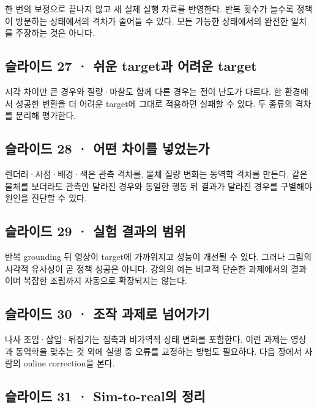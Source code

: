 \documentclass[11pt,a4paper]{article}
\begin{document}
한 번의 보정으로 끝나지 않고 새 실제 실행 자료를 반영한다. 반복 횟수가 늘수록 정책이 방문하는 상태에서의 격차가 줄어들 수 있다. 모든 가능한 상태에서의 완전한 일치를 주장하는 것은 아니다.\par

\subsection{슬라이드 27 · 쉬운 target과 어려운 target}

시각 차이만 큰 경우와 질량·마찰도 함께 다른 경우는 전이 난도가 다르다. 한 환경에서 성공한 변환을 더 어려운 target에 그대로 적용하면 실패할 수 있다. 두 종류의 격차를 분리해 평가한다.\par

\subsection{슬라이드 28 · 어떤 차이를 넣었는가}

렌더러·시점·배경·색은 관측 격차를, 물체 질량 변화는 동역학 격차를 만든다. 같은 물체를 보더라도 관측만 달라진 경우와 동일한 행동 뒤 결과가 달라진 경우를 구별해야 원인을 진단할 수 있다.\par

\subsection{슬라이드 29 · 실험 결과의 범위}

반복 grounding 뒤 영상이 target에 가까워지고 성능이 개선될 수 있다. 그러나 그림의 시각적 유사성이 곧 정책 성공은 아니다. 강의의 예는 비교적 단순한 과제에서의 결과이며 복잡한 조립까지 자동으로 확장되지는 않는다.\par

\subsection{슬라이드 30 · 조작 과제로 넘어가기}

나사 조임·삽입·뒤집기는 접촉과 비가역적 상태 변화를 포함한다. 이런 과제는 영상과 동역학을 맞추는 것 외에 실행 중 오류를 교정하는 방법도 필요하다. 다음 장에서 사람의 online correction을 본다.\par

\subsection{슬라이드 31 · Sim-to-real의 정리}
\end{document}
